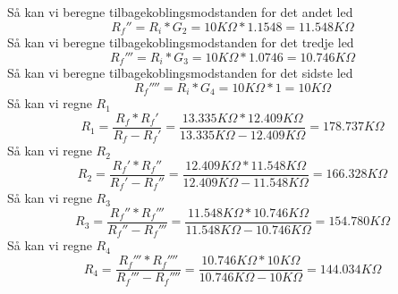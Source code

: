 \noindent
%
Så kan vi beregne tilbagekoblingsmodstanden for det andet led
%
\begin{equation}
	R_f'' = R_i*G_2 = 10K\Omega*1.1548 = 11.548K\Omega
\end{equation}
\noindent
%
Så kan vi beregne tilbagekoblingsmodstanden for det tredje led
%
\begin{equation}
	R_f''' = R_i*G_3 = 10K\Omega*1.0746 = 10.746K\Omega
\end{equation}
\noindent
%
Så kan vi beregne tilbagekoblingsmodstanden for det sidste led
%
\begin{equation}
	R_f'''' = R_i*G_4 = 10K\Omega*1 = 10K\Omega
\end{equation}
\noindent
%
Så kan vi regne $R_{1}$
%
\begin{equation}
	R_1 = \frac{R_f*R_f'}{R_f-R_f'} = \frac{13.335K\Omega*12.409K\Omega}{13.335K\Omega-12.409K\Omega} = 178.737K\Omega
\end{equation}
\noindent
%
Så kan vi regne $R_{2}$
%
\begin{equation}
	R_2 = \frac{R_f'*R_f''}{R_f'-R_f''} = \frac{12.409K\Omega*11.548K\Omega}{12.409K\Omega-11.548K\Omega} = 166.328K\Omega
\end{equation}
%
Så kan vi regne $R_{3}$
%
\begin{equation}
	R_3 = \frac{R_f''*R_f'''}{R_f''-R_f'''} = \frac{11.548K\Omega*10.746K\Omega}{11.548K\Omega-10.746K\Omega} = 154.780K\Omega
\end{equation}
%
Så kan vi regne $R_{4}$
%
\begin{equation}
	R_4 = \frac{R_f'''*R_f''''}{R_f'''-R_f''''} = \frac{10.746K\Omega*10K\Omega}{10.746K\Omega-10K\Omega} = 144.034K\Omega
\end{equation}
